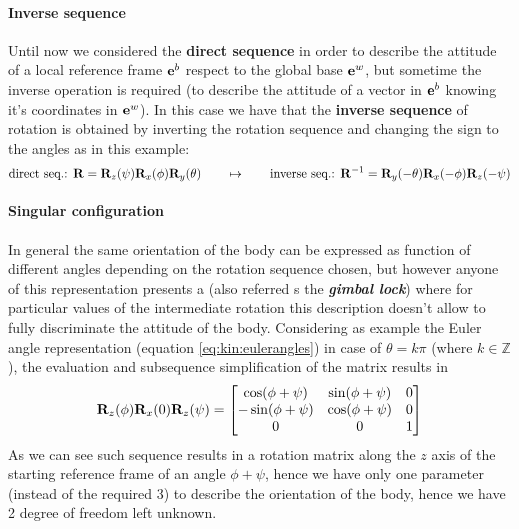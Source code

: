 		\paragraph{Inverse sequence} Until now we considered the \textbf{direct sequence} in order to describe the attitude of a local reference frame $\mathbf{e}^b$ respect to the global base $\mathbf{e}^w$, but sometime the inverse operation is required (to describe the attitude of a vector in $\mathbf{e}^b$ knowing it's coordinates in $\mathbf{e}^w$). In this case we have that the \textbf{inverse sequence} of rotation is obtained by inverting the rotation sequence and changing the sign to the angles as in this example:
		\begin{equation} \label{eq:rot:inversesequence}
			\textrm{direct seq.: } \mathbf{R} = \mathbf{R}_z(\psi) \mathbf{R}_x(\phi)\mathbf{R}_y(\theta) \qquad \mapsto \qquad \textrm{inverse seq.: } \mathbf{R}^{-1} = \mathbf{R}_y(-\theta) \mathbf{R}_x(-\phi) \mathbf{R}_z(-\psi)
		\end{equation}
	
		\paragraph{Singular configuration} In general the same orientation of the body can be expressed as function of different angles depending on the rotation sequence chosen, but however anyone of this representation presents a  (also referred s the \textbf{\textit{gimbal lock}}) where for particular values of the intermediate rotation this description doesn't allow to fully discriminate the attitude of the body. Considering as example the Euler angle representation (equation \ref{eq:kin:eulerangles}) in case of $\theta = k\pi$ (where $k\in \mathds Z$), the evaluation and subsequence simplification of the matrix results in
		\[ \mathbf{R}_z(\phi) \mathbf{R}_x(0) \mathbf{R}_z(\psi) = \begin{bmatrix}  \cos(\phi + \psi) & \sin(\phi + \psi) & 0 \\ -\sin(\phi+\psi) & \cos(\phi+\psi) & 0 \\ 0 & 0 & 1  \end{bmatrix} \]
		As we can see such sequence results in a rotation matrix along the $z$ axis of the starting reference frame of an angle $\phi+\psi$, hence we have only one parameter (instead of the required 3) to describe the orientation of the body, hence we have 2 degree of freedom left unknown.
		
